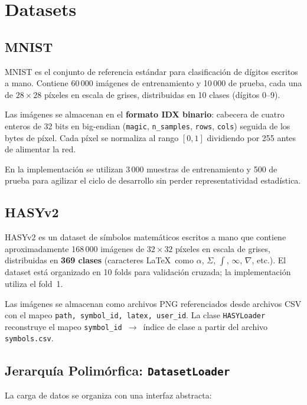 \documentclass[12pt,a4paper]{article}
\begin{document}
\section{Datasets}

\subsection{MNIST}

MNIST es el conjunto de referencia estándar para clasificación de dígitos escritos a
mano. Contiene 60\,000 imágenes de entrenamiento y 10\,000 de prueba, cada una de
$28 \times 28$ píxeles en escala de grises, distribuidas en 10 clases (dígitos 0--9).

Las imágenes se almacenan en el \textbf{formato IDX binario}: cabecera de cuatro
enteros de 32 bits en big-endian (\texttt{magic}, \texttt{n\_samples}, \texttt{rows},
\texttt{cols}) seguida de los bytes de píxel. Cada píxel se normaliza al rango $[0,1]$
dividiendo por 255 antes de alimentar la red.

En la implementación se utilizan 3\,000 muestras de entrenamiento y 500 de prueba para
agilizar el ciclo de desarrollo sin perder representatividad estadística.

\subsection{HASYv2}

HASYv2 es un dataset de símbolos matemáticos escritos a mano que contiene
aproximadamente 168\,000 imágenes de $32 \times 32$ píxeles en escala de grises,
distribuidas en \textbf{369 clases} (caracteres \LaTeX\ como $\alpha$, $\Sigma$,
$\int$, $\infty$, $\nabla$, etc.). El dataset está organizado en 10 folds para
validación cruzada; la implementación utiliza el fold~1.

Las imágenes se almacenan como archivos PNG referenciados desde archivos CSV con el
mapeo \texttt{path, symbol\_id, latex, user\_id}. La clase \texttt{HASYLoader}
reconstruye el mapeo \texttt{symbol\_id}~$\to$~índice de clase a partir del archivo
\texttt{symbols.csv}.

\subsection{Jerarquía Polimórfica: \texttt{DatasetLoader}}

La carga de datos se organiza con una interfaz abstracta:
\end{document}
